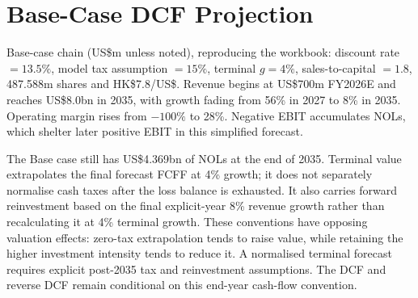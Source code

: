 \documentclass[11pt]{article}
\begin{document}
\clearpage
\section{Base-Case DCF Projection}
\label{sec:proj}
Base-case chain (US\$m unless noted), reproducing the workbook: discount rate $=13.5\%$, model tax assumption $=15\%$, terminal $g=4\%$, sales-to-capital $=1.8$, 487.588m shares and HK\$7.8/US\$. Revenue begins at US\$700m FY2026E and reaches US\$8.0bn in 2035, with growth fading from 56\% in 2027 to 8\% in 2035. Operating margin rises from $-100\%$ to 28\%. Negative EBIT accumulates NOLs, which shelter later positive EBIT in this simplified forecast.

The Base case still has US\$4.369bn of NOLs at the end of 2035. Terminal value extrapolates the final forecast FCFF at 4\% growth; it does not separately normalise cash taxes after the loss balance is exhausted. It also carries forward reinvestment based on the final explicit-year 8\% revenue growth rather than recalculating it at 4\% terminal growth. These conventions have opposing valuation effects: zero-tax extrapolation tends to raise value, while retaining the higher investment intensity tends to reduce it. A normalised terminal forecast requires explicit post-2035 tax and reinvestment assumptions. The DCF and reverse DCF remain conditional on this end-year cash-flow convention.
\end{document}
